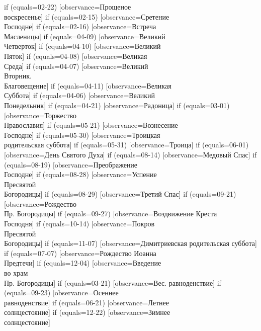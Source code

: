{  if (equals=02-22) [observance=Прощеное\\ воскресенье]
  if (equals=02-15) [observance=Сретение\\ Господне]
  if (equals=02-16) [observance=Встреча\\ Масленицы]
  if (equals=04-09) [observance=Великий\\ Четверток]
  if (equals=04-10) [observance=Великий\\ Пяток]
  if (equals=04-08) [observance=Великая\\ Среда]
  if (equals=04-07) [observance=Великий\\ Вторник.\\ Благовещение]
  if (equals=04-11) [observance=Великая\\ Суббота]
  if (equals=04-06) [observance=Великий\\ Понедельник]
  if (equals=04-21) [observance=Радоница]
  if (equals=03-01) [observance=Торжество\\ Православия]
  if (equals=05-21) [observance=Вознесение\\ Господне]
  if (equals=05-30) [observance=Троицкая\\ родительская суббота]
  if (equals=05-31) [observance=Троица]
  if (equals=06-01) [observance=День Святого Духа]
  if (equals=08-14) [observance=Медовый Спас]
  if (equals=08-19) [observance=Преображение\\ Господне]
  if (equals=08-28) [observance=Успение\\ Пресвятой\\ Богородицы]
  if (equals=08-29) [observance=Третий Спас]
  if (equals=09-21) [observance=Рождество\\ Пр. Богородицы]
  if (equals=09-27) [observance=Воздвижение Креста\\ Господня]
  if (equals=10-14) [observance=Покров\\ Пресвятой\\ Богородицы]
  if (equals=11-07) [observance=Димитриевская родительская суббота]
  if (equals=07-07) [observance=Рождество Иоанна\\ Предтечи]
  if (equals=12-04) [observance=Введение\\ во храм\\ Пр. Богородицы]
  if (equals=03-21) [observance=Вес. равноденствие]
  if (equals=09-23) [observance=Осеннее\\ равноденствие]
  if (equals=06-21) [observance=Летнее\\ солнцестояние]
  if (equals=12-22) [observance=Зимнее\\ солнцестояние]
}

